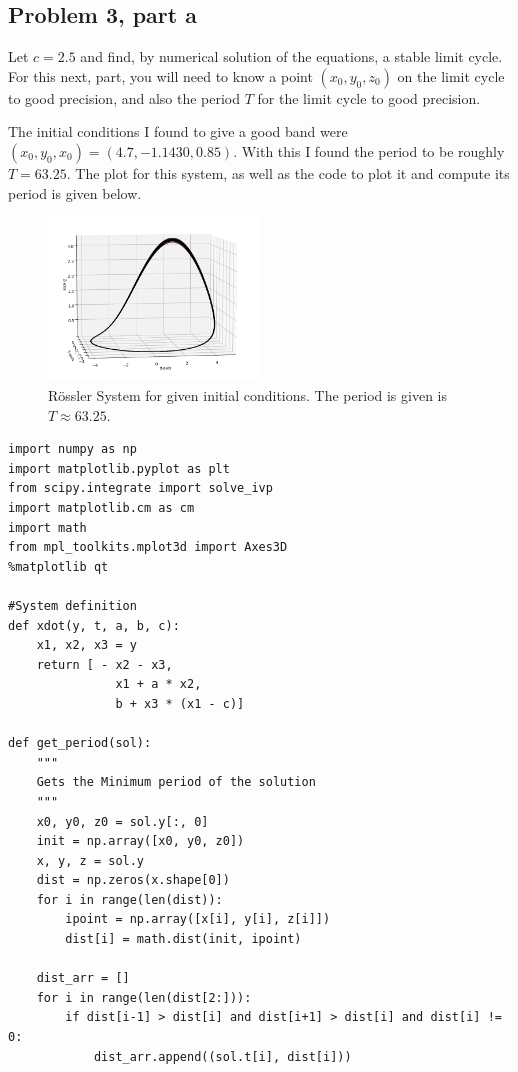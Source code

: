 \subsection{Problem 3, part a}
Let $c = 2.5$ and find, by numerical solution of the equations, a stable limit cycle. For this next, part, you will need to know a point $(x_0, y_0, z_0)$ on the limit cycle to good precision, and also the period $T$ for the limit cycle to good precision.
\partbreak
\begin{solution}

    The initial conditions I found to give a good band were $(x_0, y_0, x_0) = (4.7, -1.1430, 0.85)$. With this I found the period to be roughly $T = 63.25$. The plot for this system, as well as the code to plot it and compute its period is given below.

    \begin{figure}[h]
        \centering
        \includegraphics[width = 0.5\textwidth]{Images/p3im.png}
        \caption{R\"ossler System for given initial conditions. The period is given is $T\approx 63.25$.}
        \label{fig:p3 system}
    \end{figure}

\newpage
\begin{lstlisting}
import numpy as np
import matplotlib.pyplot as plt
from scipy.integrate import solve_ivp
import matplotlib.cm as cm
import math
from mpl_toolkits.mplot3d import Axes3D
%matplotlib qt

#System definition
def xdot(y, t, a, b, c):
    x1, x2, x3 = y
    return [ - x2 - x3,
               x1 + a * x2,
               b + x3 * (x1 - c)]

def get_period(sol):
    """
    Gets the Minimum period of the solution
    """
    x0, y0, z0 = sol.y[:, 0]
    init = np.array([x0, y0, z0])
    x, y, z = sol.y
    dist = np.zeros(x.shape[0])
    for i in range(len(dist)):
        ipoint = np.array([x[i], y[i], z[i]])
        dist[i] = math.dist(init, ipoint)

    dist_arr = []
    for i in range(len(dist[2:])):
        if dist[i-1] > dist[i] and dist[i+1] > dist[i] and dist[i] != 0:
            dist_arr.append((sol.t[i], dist[i]))
    

\end{lstlisting}
\end{solution}
